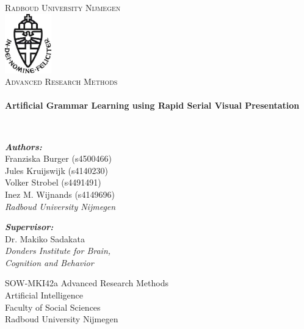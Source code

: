 \begin{titlepage}
\begin{center}

\textsc{\LARGE Radboud University Nijmegen}\\[1cm]

\includegraphics[width=0.15\textwidth]{media/ru-logo}~\\[1cm]

\textsc{\Large Advanced Research Methods}\\[0.6cm]

\HRule \\[0.4cm]
{ \huge \bfseries Artificial Grammar Learning using Rapid Serial Visual Presentation \\[0.4cm] }

\HRule \\[1.2cm]

\begin{flushleft} \large
\emph{\textbf{Authors:}}\\
Franziska Burger (s4500466)\\
Jules Kruijswijk (s4140230)\\
Volker Strobel (s4491491)\\
Inez M. Wijnands (s4149696)\\
\emph{Radboud University Nijmegen}\\
\end{flushleft}
\begin{flushleft} \large
\emph{\textbf{Supervisor:}} \\
Dr. Makiko Sadakata\\
\emph{Donders Institute for Brain,\\
Cognition and Behavior}\\
\end{flushleft}


\vfill

SOW-MKI42a Advanced Research Methods\\
Artificial Intelligence\\
Faculty of Social Sciences\\
Radboud University Nijmegen\\
\vspace{0.2cm}
\date{\large\today} %

\end{center}
\end{titlepage}